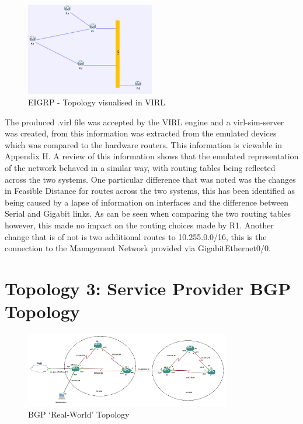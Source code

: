 \documentclass[11pt]{report}
\begin{document}
\begin{figure}[h!]
	\caption{EIGRP - Topology visualised in VIRL}
	\centering
	\begin{center}
		\includegraphics[width=0.5\textwidth]{EIGRP-VIRL.png}
	\end{center}
\end{figure}

The produced .virl file was accepted by the VIRL engine and a virl-sim-server was created, from this information was extracted from the emulated devices which was compared to the hardware routers. This information is viewable in Appendix H. A review of this information shows that the emulated representation of the network behaved in a similar way, with routing tables being reflected across the two systems. One particular difference that was noted was the changes in Feasible Distance for routes across the two systems, this has been identified as being caused by a lapse of information on interfaces and the difference between Serial and Gigabit links. As can be seen when comparing the two routing tables however, this made no impact on the routing choices made by R1. Another change that is of not is two additional routes to 10.255.0.0/16, this is the connection to the Management Network provided via GigabitEthernet0/0.

\section{Topology 3: Service Provider BGP Topology}

\begin{figure}[h!]
	\caption{BGP `Real-World' Topology}
	\centering
	\begin{center}
		\includegraphics[width=0.8\textwidth]{BGP-Topology.png}
	\end{center}
\end{figure}
\end{document}
